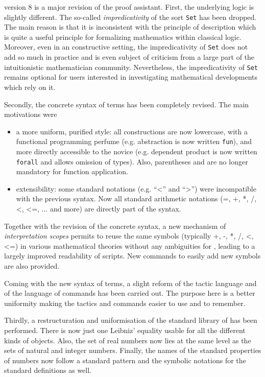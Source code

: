{\Coq} version 8 is a major revision of the {\Coq} proof assistant.
First, the underlying logic is slightly different. The so-called {\em
impredicativity} of the sort {\tt Set} has been dropped. The main
reason is that it is inconsistent with the principle of description
which is quite a useful principle for formalizing %
mathematics within classical logic. Moreover, even in an constructive
setting, the impredicativity of {\tt Set} does not add so much in
practice and is even subject of criticism from a large part of the
intuitionistic mathematician community. Nevertheless, the
impredicativity of {\tt Set} remains optional for users interested in
investigating mathematical developments which rely on it.

Secondly, the concrete syntax of terms has been completely
revised. The main motivations were

\begin{itemize}
\item a more uniform, purified style: all constructions are now lowercase, 
  with a functional programming perfume (e.g. abstraction is now
  written {\tt fun}), and more directly accessible to the novice
  (e.g. dependent product is now written {\tt forall} and allows
  omission of types). Also, parentheses and are no longer mandatory
  for function application.
\item extensibility: some standard notations (e.g. ``<'' and ``>'') were
  incompatible with the previous syntax. Now all standard arithmetic
  notations (=, +, *, /, <, <=, ... and more) are directly part of the
  syntax.
\end{itemize}

Together with the revision of the concrete syntax, a new mechanism of
{\em interpretation scopes} permits to reuse the same symbols
(typically +, -, *, /, <, <=) in various mathematical theories without
any ambiguities for {\Coq}, leading to a largely improved readability of
{\Coq} scripts. New commands to easily add new symbols are also
provided.

Coming with the new syntax of terms, a slight reform of the tactic
language and of the language of commands has been carried out. The
purpose here is a better uniformity making the tactics and commands
easier to use and to remember.

Thirdly, a restructuration and uniformisation of the standard library
of {\Coq} has been performed. There is now just one Leibniz' equality
usable for all the different kinds of {\Coq} objects. Also, the set of
real numbers now lies at the same level as the sets of natural and
integer numbers. Finally, the names of the standard properties of
numbers now follow a standard pattern and the symbolic
notations for the standard definitions as well.


